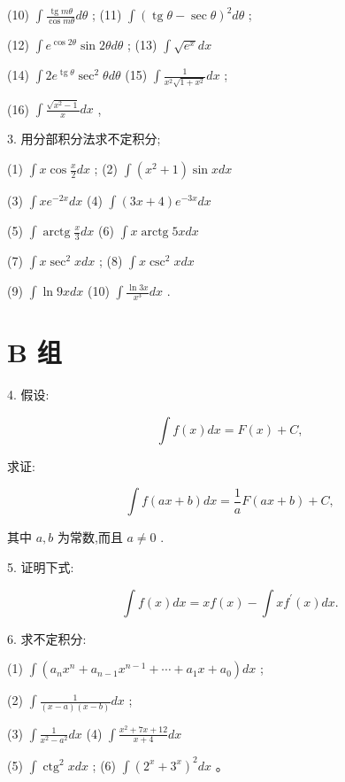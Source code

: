 \documentclass[lang=cn,newtx,12pt,scheme=chinese]{elegantbook}
\begin{document}
(10) \(\int \frac{\operatorname{tg}{m\theta }}{\cos {m\theta }}{d\theta }\) ; (11) \(\int {\left( \operatorname{tg}\theta - \sec \theta \right) }^{2}{d\theta }\) ;

(12) \(\int {e}^{\cos {2\theta }}\sin {2\theta d\theta }\) ; (13) \(\int \sqrt{{e}^{x}}{dx}\)

(14) \(\int 2{e}^{\operatorname{tg}\theta }{\sec }^{2}{\theta d\theta }\) (15) \(\int \frac{1}{{x}^{2}\sqrt{1 + {x}^{2}}}{dx}\) ;

(16) \(\int \frac{\sqrt{{x}^{2} - 1}}{x}{dx}\) ,

3. 用分部积分法求不定积分;

(1) \(\int x\cos \frac{x}{2}{dx}\) ; (2) \(\int \left( {{x}^{2} + 1}\right) \sin {xdx}\)

(3) \(\int x{e}^{-{2x}}{dx}\) (4) \(\int \left( {{3x} + 4}\right) {e}^{-{3x}}{dx}\)

(5) \(\int \operatorname{arctg}\frac{x}{3}{dx}\) (6) \(\int x\operatorname{arctg}{5xdx}\)

(7) \(\int x{\sec }^{2}{xdx}\) ; (8) \(\int x{\csc }^{2}{xdx}\)

(9) \(\int \ln {9xdx}\) (10) \(\int \frac{\ln {3x}}{{x}^{3}}{dx}\) .

\section*{B 组}

4. 假设:

\[
\int f\left( x\right) {dx} = F\left( x\right) + C,
\]

求证:

\[
\int f\left( {{ax} + b}\right) {dx} = \frac{1}{a}F\left( {{ax} + b}\right) + C,
\]

其中 \(a,b\) 为常数,而且 \(a \neq 0\) .

5. 证明下式:

\[
\int f\left( x\right) {dx} = {xf}\left( x\right) - \int x{f}^{\prime }\left( x\right) {dx}.
\]

6. 求不定积分:

(1) \(\int \left( {{a}_{n}{x}^{n} + {a}_{n - 1}{x}^{n - 1} + \cdots + {a}_{1}x + {a}_{0}}\right) {dx}\) ;

(2) \(\int \frac{1}{\left( {x - a}\right) \left( {x - b}\right) }{dx}\) ;

(3) \(\int \frac{1}{{x}^{2} - {a}^{2}}{dx}\) (4) \(\int \frac{{x}^{2} + {7x} + {12}}{x + 4}{dx}\)

(5) \(\int {\operatorname{ctg}}^{2}{xdx}\) ; (6) \(\int {\left( {2}^{x} + {3}^{x}\right) }^{2}{dx}\) 。
\end{document}
